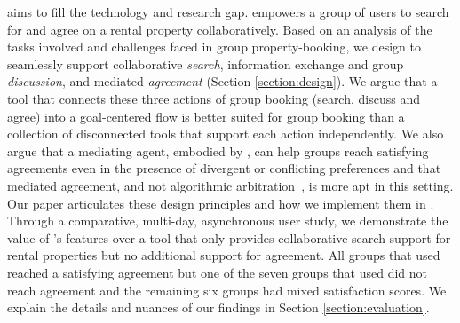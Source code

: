 \tool aims to fill the technology and research gap. \tool empowers a group of users to search for and agree on a rental property collaboratively. Based on an analysis of the tasks involved and challenges faced in group property-booking, we design \tool to seamlessly support collaborative \textit{search}, information exchange and group \textit{discussion}, and mediated \textit{agreement} (Section \ref{section:design}). We argue that a tool that connects these three actions of group booking (search, discuss and agree) into a goal-centered flow is better suited for group booking than a collection of disconnected tools that support each action independently. We also argue that a mediating agent, embodied by \cbot, can help groups reach satisfying agreements even in the presence of divergent or conflicting preferences and that mediated agreement, and not algorithmic arbitration~\cite{spliddit}, is more apt in this setting. Our paper articulates these design principles and how we implement them in \tool. Through a comparative, multi-day, asynchronous user study, we demonstrate the value of \tool's features over a \baseline tool that only provides collaborative search support for rental properties but no additional support for agreement. All groups that used \tool reached a satisfying agreement but one of the seven  groups that used \baseline did not reach agreement and the remaining six groups had mixed satisfaction scores. We explain the details and nuances of our findings in 
Section \ref{section:evaluation}.
